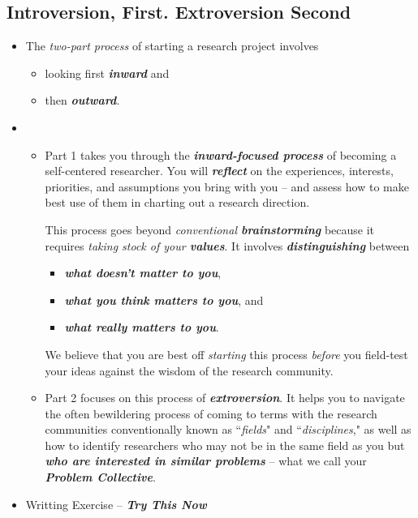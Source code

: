 \documentclass[11pt]{article}
\begin{document}
\subsection{Introversion, First. Extroversion Second}
\begin{itemize}
\item The \emph{two-part process} of starting a research project involves
\begin{itemize}
\item  looking first \emph{\textbf{inward}} and
\item   then \emph{\textbf{outward}}.
\end{itemize}

\item 
\begin{itemize}
\item Part 1 takes you through the \emph{\textbf{inward-focused process}} of becoming a self-centered researcher.  You will \emph{\textbf{reflect}} on the experiences, interests, priorities, and assumptions you bring with you -- and assess how to make best use of them in charting out a research direction. 

This process goes beyond \emph{conventional \textbf{brainstorming}} because it requires \emph{taking stock of your \textbf{values}}. It involves \emph{\textbf{distinguishing}} between
\begin{itemize}
\item \emph{\textbf{what doesn’t matter to you}}, 
\item \emph{\textbf{what you think matters to you}}, and 
\item \emph{\textbf{what really matters to you}}. 
\end{itemize} We believe that you are best off \emph{starting} this process \emph{before} you field-test your ideas against the wisdom of the research community. 

\item Part 2 focuses on this process of \emph{\textbf{extroversion}}. It helps you to navigate the often bewildering process of coming to terms with the research communities conventionally known as ``\emph{fields}" and ``\emph{disciplines}," as well as how to identify researchers who may not be in the same field as you but \emph{\textbf{who are interested in similar problems}} -- what we call your \emph{\textbf{Problem Collective}}.
\end{itemize}

\item \begin{exercise}  Writting Exercise -- \emph{\textbf{Try This Now}}


\end{exercise}
\end{itemize}
\end{document}

